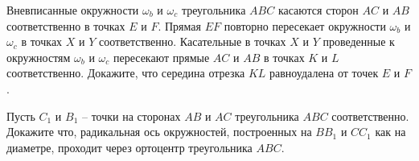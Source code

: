 \begin{tasks}
                \moditem{*} Вневписанные окружности $\omega_b$ и $\omega_c$ треугольника $ABC$ касаются сторон $AC$ и $AB$ соответственно в точках $E$ и $F$. Прямая $EF$ повторно пересекает окружности $\omega_b$ и $\omega_c$ в точках $X$ и $Y$ соответственно. Касательные в точках $X$ и $Y$ проведенные к окружностям $\omega_b$ и $\omega_c$ пересекают прямые $AC$ и $AB$ в точках $K$ и $L$ соответственно. Докажите, что середина отрезка $KL$ равноудалена от точек $E$ и $F$.


                \item \begin{tasks}
                    \item\label{lem:Hinradicalaxis}Пусть $C_1$ и $B_1$  -- точки на сторонах $AB$ и $AC$ треугольника $ABC$ соответственно. Докажите что, радикальная ось окружностей, построенных на $BB_1$ и $CC_1$ как на диаметре, проходит через ортоцентр треугольника $ABC$. 



\end{tasks}
\end{tasks}
